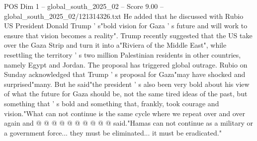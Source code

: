 \begin{textsample}{POS Dim 1 – global\_south\_2025\_02 – Score 9.00 – global\_south\_2025\_02/121314326.txt}
He added that he discussed with Rubio US President Donald Trump ' s"bold vision for Gaza ' s future and will work to ensure that vision becomes a reality".
Trump recently suggested that the US take over the Gaza Strip and turn it into a"Riviera of the Middle East", while resettling the territory ' s two million Palestinian residents in other countries, namely Egypt and Jordan.
The proposal has triggered global outrage.
Rubio on Sunday acknowledged that Trump ' s proposal for Gaza"may have shocked and surprised"many.
But he said"the president ' s also been very bold about his view of what the future for Gaza should be, not the same tired ideas of the past, but something that ' s bold and something that, frankly, took courage and vision."What can not continue is the same cycle where we repeat over and over again and @ @ @ @ @ @ @ @ @ @ said."Hamas can not continue as a military or a government force... they must be eliminated... it must be eradicated."

\end{textsample}
